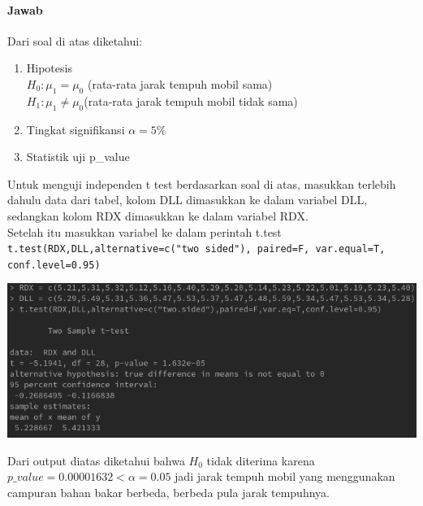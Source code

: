 \documentclass[a4paper,12pt]{article}
\begin{document}
\paragraph{Jawab\\}
Dari soal di atas diketahui:
\begin{enumerate}[label = \alph*.]
    \item Hipotesis \\
        $H_{0} : \mu_{1} = \mu_{0}$ (rata-rata jarak tempuh mobil sama)\\
        $H_{1} : \mu_{1} \neq \mu_{0}$(rata-rata jarak tempuh mobil tidak sama)
    \item Tingkat signifikansi $\alpha = 5\%$
    \item Statistik uji p\_value
\end{enumerate}
Untuk menguji independen t test berdasarkan soal di atas, masukkan terlebih dahulu data dari tabel, kolom DLL dimasukkan ke dalam variabel DLL, sedangkan kolom RDX dimasukkan ke 
dalam variabel RDX.\\
Setelah itu masukkan variabel ke dalam perintah t.test\\
\texttt{t.test(RDX,DLL,alternative=c("two sided"), paired=F, var.equal=T, conf.level=0.95)}
\begin{center}
    \includegraphics[width = \linewidth]{lat1.png}
\end{center}
Dari output diatas diketahui bahwa $H_{0}$ tidak diterima karena $p\_value = 0.00001632 < \alpha = 0.05$ jadi jarak tempuh mobil yang menggunakan campuran bahan bakar berbeda, berbeda pula
jarak tempuhnya.
\end{document}
